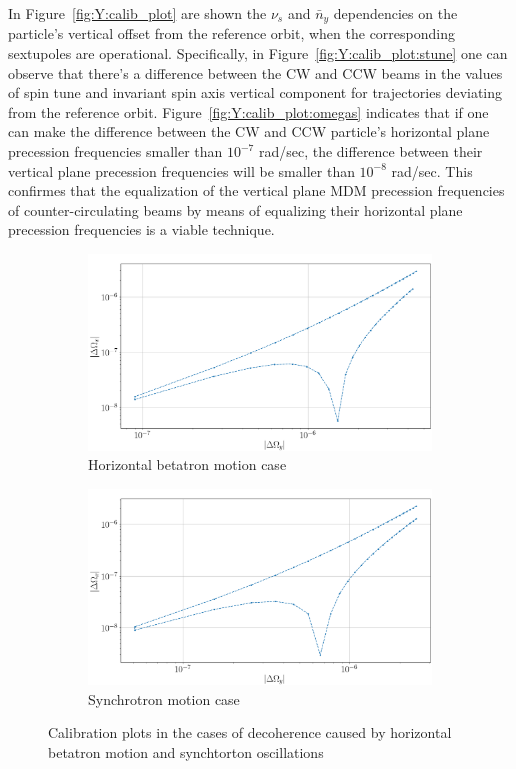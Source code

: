 \documentclass[a4paper]{jacow}
\newcommand{\nbar}{\bar n}
\begin{document}
In Figure~\ref{fig:Y:calib_plot} are shown the $\nu_s$ and $\nbar_y$ dependencies on the particle's
vertical offset from the reference orbit, when the corresponding sextupoles are operational. Specifically, in
Figure~\ref{fig:Y:calib_plot:stune} one can observe that there's a difference between the CW and CCW beams
in the values of spin tune and invariant spin axis vertical component for trajectories
deviating from the reference orbit. Figure~\ref{fig:Y:calib_plot:omegas} indicates that if one can make the
difference between the CW and CCW particle's horizontal plane precession frequencies
smaller than $10^{-7}$ rad/sec,
the difference between their vertical plane precession frequencies will be smaller than $10^{-8}$ rad/sec.
This confirmes that the equalization of the vertical plane MDM precession frequencies of counter-circulating
beams by means of equalizing their horizontal plane precession frequencies is a viable technique.

\begin{figure}[h]
  \centering
  \begin{subfigure}{\linewidth}
    \includegraphics[width=\linewidth]{../img/IPAC19/GFF_omegas_range_X}
    \caption{Horizontal betatron motion case\label{fig:X:calib_plot:omegas}}
  \end{subfigure}
  \begin{subfigure}{\linewidth}
    \includegraphics[width=\linewidth]{../img/IPAC19/GFF_omegas_range_D}
    \caption{Synchrotron motion case\label{fig:D:calib_plot:omegas}}
  \end{subfigure}
  \caption{Calibration plots in the cases of decoherence caused by horizontal betatron motion
    and synchtorton oscillations\label{fig:calib_plot:omegas}}
\end{figure}
\end{document}
